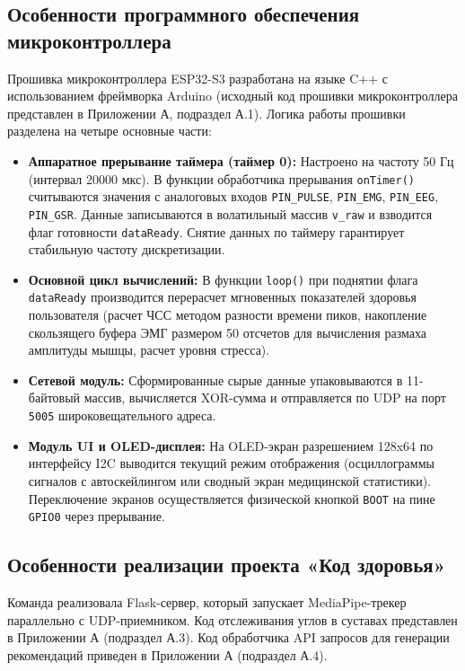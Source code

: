 \documentclass[utf8, russian]{eskdtext}
\begin{document}
\subsection{Особенности программного обеспечения микроконтроллера}
Прошивка микроконтроллера ESP32-S3 разработана на языке C++ с использованием фреймворка Arduino (исходный код прошивки микроконтроллера представлен в Приложении А, подраздел А.1). Логика работы прошивки разделена на четыре основные части:
\begin{itemize}
    \item \textbf{Аппаратное прерывание таймера (таймер 0):} Настроено на частоту 50 Гц (интервал 20000 мкс). В функции обработчика прерывания \texttt{onTimer()} считываются значения с аналоговых входов \texttt{PIN\_PULSE}, \texttt{PIN\_EMG}, \texttt{PIN\_EEG}, \texttt{PIN\_GSR}. Данные записываются в волатильный массив \texttt{v\_raw} и взводится флаг готовности \texttt{dataReady}. Снятие данных по таймеру гарантирует стабильную частоту дискретизации.
    \item \textbf{Основной цикл вычислений:} В функции \texttt{loop()} при поднятии флага \texttt{dataReady} производится перерасчет мгновенных показателей здоровья пользователя (расчет ЧСС методом разности времени пиков, накопление скользящего буфера ЭМГ размером 50 отсчетов для вычисления размаха амплитуды мышцы, расчет уровня стресса).
    \item \textbf{Сетевой модуль:} Сформированные сырые данные упаковываются в 11-байтовый массив, вычисляется XOR-сумма и отправляется по UDP на порт \texttt{5005} широковещательного адреса.
    \item \textbf{Модуль UI и OLED-дисплея:} На OLED-экран разрешением 128x64 по интерфейсу I2C выводится текущий режим отображения (осциллограммы сигналов с автоскейлингом или сводный экран медицинской статистики). Переключение экранов осуществляется физической кнопкой \texttt{BOOT} на пине \texttt{GPIO0} через прерывание.
\end{itemize}

\subsection{Особенности реализации проекта «Код здоровья»}
Команда реализовала Flask-сервер, который запускает MediaPipe-трекер параллельно с UDP-приемником. Код отслеживания углов в суставах представлен в Приложении А (подраздел А.3). Код обработчика API запросов для генерации рекомендаций приведен в Приложении А (подраздел А.4).
\end{document}
